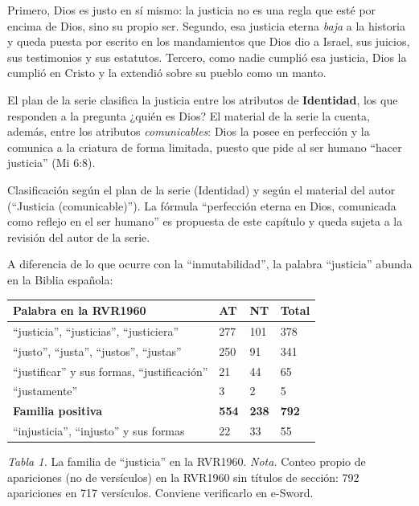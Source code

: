 \documentclass[11pt,letterpaper]{article}
\newcommand{\destacar}[1]{\textbf{\textcolor{azul}{#1}}}
\begin{document}
Primero, Dios es justo en sí mismo: la justicia no es una regla que esté por encima de Dios, sino su propio ser. Segundo, esa justicia eterna \emph{baja} a la historia y queda puesta por escrito en los mandamientos que Dios dio a Israel, sus juicios, sus testimonios y sus estatutos. Tercero, como nadie cumplió esa justicia, Dios la cumplió en Cristo y la extendió sobre su pueblo como un manto.

El plan de la serie clasifica la justicia entre los atributos de \destacar{Identidad}, los que responden a la pregunta ¿quién es Dios? El material de la serie la cuenta, además, entre los atributos \emph{comunicables}: Dios la posee en perfección y la comunica a la criatura de forma limitada, puesto que pide al ser humano ``hacer justicia'' (Mi 6:8).

\begin{nota}[Precisión]
Clasificación según el plan de la serie (Identidad) y según el material del autor (``Justicia (comunicable)''). La fórmula ``perfección eterna en Dios, comunicada como reflejo en el ser humano'' es propuesta de este capítulo y queda sujeta a la revisión del autor de la serie.
\end{nota}

A diferencia de lo que ocurre con la ``inmutabilidad'', la palabra ``justicia'' abunda en la Biblia española:

\begin{center}\small\renewcommand{\arraystretch}{1.18}
\begin{tabular}{@{}L{5.2cm}L{2.0cm}L{2.0cm}L{2.0cm}@{}}
\toprule
\textbf{Palabra en la RVR1960} & \textbf{AT} & \textbf{NT} & \textbf{Total} \\ \midrule
``justicia'', ``justicias'', ``justiciera'' & 277 & 101 & 378 \\
``justo'', ``justa'', ``justos'', ``justas'' & 250 & 91 & 341 \\
``justificar'' y sus formas, ``justificación'' & 21 & 44 & 65 \\
``justamente'' & 3 & 2 & 5 \\ \midrule
\textbf{Familia positiva} & \textbf{554} & \textbf{238} & \textbf{792} \\
``injusticia'', ``injusto'' y sus formas & 22 & 33 & 55 \\
\bottomrule
\end{tabular}\par
{\footnotesize\color{gris}\textit{Tabla 1.} La familia de ``justicia'' en la RVR1960. \textit{Nota.} Conteo propio de apariciones (no de versículos) en la RVR1960 sin títulos de sección: 792 apariciones en 717 versículos. Conviene verificarlo en e-Sword.}
\end{center}
\end{document}
